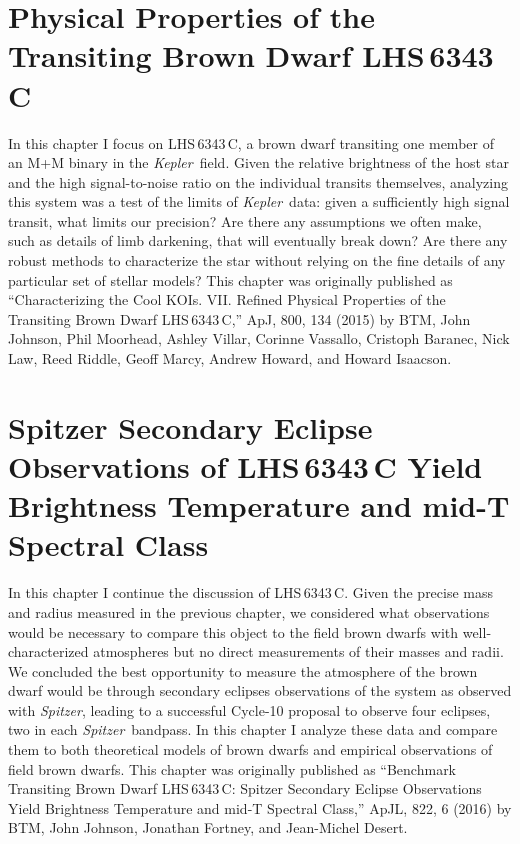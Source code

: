 \documentclass[12pt]{caltech_thesis}
\newcommand{\kep}{{\textit {Kepler}}}
\newcommand{\spitz}{{\textit {Spitzer}}}
\begin{document}
%

\chapter{Physical Properties of the Transiting Brown Dwarf LHS\,6343\,C}
\label{chap:lhs1}


In this chapter I focus on LHS\,6343\,C, a brown dwarf transiting one member of an M+M binary in the \kep\ field.
Given the relative brightness of the host star and the high signal-to-noise ratio on the individual transits themselves,
analyzing this system was a test of the limits of \kep\ data: given a sufficiently high signal transit, what limits our precision?
Are there any assumptions we often make, such as details of limb darkening, that will eventually break down? 
Are there any robust methods to characterize the star without relying on the fine details of any particular set of stellar models?
This chapter was originally published as ``Characterizing the Cool KOIs. VII. Refined Physical Properties of the Transiting Brown Dwarf LHS\,6343\,C,'' ApJ, 800, 134 (2015) by BTM, John Johnson, Phil Moorhead, Ashley Villar, Corinne Vassallo,
Cristoph Baranec, Nick Law, Reed Riddle, Geoff Marcy, Andrew Howard, and Howard Isaacson.

%

\chapter{Spitzer Secondary Eclipse Observations of LHS\,6343\,C Yield Brightness Temperature and mid-T Spectral Class}

\label{chap:lhsspitz}
In this chapter I continue the discussion of LHS\,6343\,C.
Given the precise mass and radius measured in the previous chapter, we considered what observations would be necessary
to compare this object to the field brown dwarfs with well-characterized atmospheres but no direct measurements of
their masses and radii.
We concluded the best opportunity to measure the atmosphere of the brown dwarf would be through secondary eclipses
observations of the system as observed with \spitz, leading to a successful Cycle-10 proposal to observe four eclipses, 
two in each \spitz\ bandpass.
In this chapter I analyze these data and compare them to both theoretical models of brown dwarfs and empirical observations
of field brown dwarfs.
This chapter was originally published as ``Benchmark Transiting Brown Dwarf LHS\,6343\,C: Spitzer Secondary Eclipse Observations Yield Brightness Temperature and mid-T Spectral Class,'' ApJL, 822, 6 (2016) by BTM, John Johnson,
Jonathan Fortney, and Jean-Michel Desert.
\end{document}
